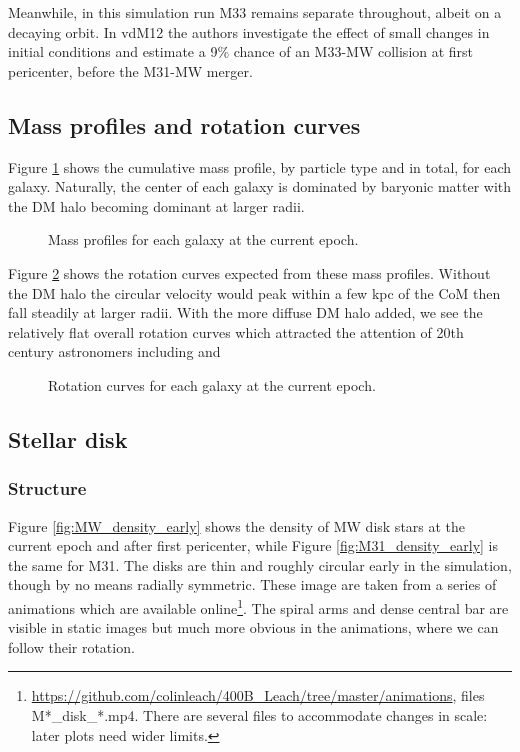 \documentclass[twocolumn]{aastex63}
\begin{document}
Meanwhile, in this simulation run M33 remains separate throughout, albeit on a decaying orbit. In vdM12 the authors investigate the effect of small changes in initial conditions and estimate a 9\% chance of an M33-MW collision at first pericenter, before the M31-MW merger.

\subsection{Mass profiles and rotation curves}

Figure \ref{fig:massprof0} shows the cumulative mass profile, by particle type and in total, for each galaxy. Naturally, the center of each galaxy is dominated by baryonic matter with the DM halo becoming dominant at larger radii.
\begin{figure}[bht!]
	\caption{Mass profiles for each galaxy at the current epoch.
		\label{fig:massprof0}}
\end{figure}

Figure \ref{fig:rotcurve0} shows the rotation curves expected from these mass profiles. Without the DM halo the circular velocity would peak within a few kpc of the CoM then fall steadily at larger radii. With the more diffuse DM halo added, we see the relatively flat overall rotation curves which attracted the attention of 20th century astronomers including \citet{zwicky_rotverschiebung_1933} and \citet{rubin_rotation_1970}

\begin{figure}[!bht!]
	\caption{Rotation curves for each galaxy at the current epoch.
		\label{fig:rotcurve0}}
\end{figure}

\subsection{Stellar disk}

\subsubsection{Structure}

Figure \ref{fig:MW_density_early} shows the density of MW disk stars at the current epoch and after first pericenter, while Figure \ref{fig:M31_density_early} is the same for M31. The disks are thin and roughly circular early in the simulation, though by no means radially symmetric. These image are taken from a series of animations which are available online\footnote{\url{https://github.com/colinleach/400B_Leach/tree/master/animations}, files M*\_disk\_*.mp4. There are several files to accommodate changes in scale: later plots need wider limits.}. The spiral arms and dense central bar are visible in static images but much more obvious in the animations, where we can follow their rotation.
\end{document}
